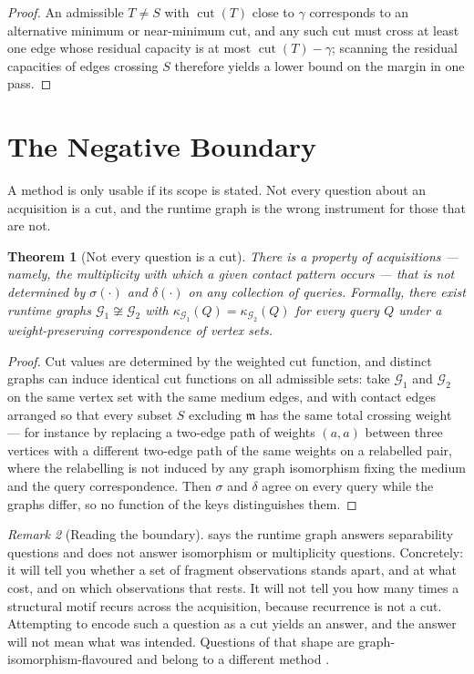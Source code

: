 \documentclass[11pt,a4paper]{article}
\newtheorem{theorem}{Theorem}[section]
\theoremstyle{definition}
\theoremstyle{remark}
\newtheorem{remark}[theorem]{Remark}
\newcommand{\Gph}{\mathcal{G}}
\newcommand{\med}{\mathfrak{m}}
\newcommand{\cut}{\operatorname{cut}}
\newcommand{\sep}{\sigma}
\newcommand{\dep}{\delta}
\newcommand{\key}{\kappa}
\begin{document}
\begin{proof}
An admissible $T \neq S$ with $\cut(T)$ close to $\gamma$ corresponds to
an alternative minimum or near-minimum cut, and any such cut must cross
at least one edge whose residual capacity is at most $\cut(T)-\gamma$;
scanning the residual capacities of edges crossing $S$ therefore yields a
lower bound on the margin in one pass.
\end{proof}

\section{The Negative Boundary}
\label{sec:limits}

A method is only usable if its scope is stated. Not every question about
an acquisition is a cut, and the runtime graph is the wrong instrument
for those that are not.

\begin{theorem}[Not every question is a cut]\label{thm:not-a-cut}
There is a property of acquisitions --- namely, the multiplicity with
which a given contact pattern occurs --- that is not determined by
$\sep(\cdot)$ and $\dep(\cdot)$ on any collection of queries. Formally,
there exist runtime graphs $\Gph_1 \not\cong \Gph_2$ with
$\key_{\Gph_1}(Q) = \key_{\Gph_2}(Q)$ for every query $Q$ under a
weight-preserving correspondence of vertex sets.
\end{theorem}

\begin{proof}
Cut values are determined by the weighted cut function, and distinct
graphs can induce identical cut functions on all admissible sets: take
$\Gph_1$ and $\Gph_2$ on the same vertex set with the same medium edges,
and with contact edges arranged so that every subset $S$ excluding $\med$
has the same total crossing weight --- for instance by replacing a
two-edge path of weights $(a,a)$ between three vertices with a different
two-edge path of the same weights on a relabelled pair, where the
relabelling is not induced by any graph isomorphism fixing the medium and
the query correspondence. Then $\sep$ and $\dep$ agree on every query
while the graphs differ, so no function of the keys distinguishes them.
\end{proof}

\begin{remark}[Reading the boundary]\label{rem:boundary}
 says the runtime graph answers separability
questions and does not answer isomorphism or multiplicity questions.
Concretely: it will tell you whether a set of fragment observations
stands apart, and at what cost, and on which observations that rests. It
will not tell you how many times a structural motif recurs across the
acquisition, because recurrence is not a cut. Attempting to encode such a
question as a cut yields an answer, and the answer will not mean what was
intended. Questions of that shape are graph-isomorphism-flavoured and
belong to a different method \citep{weisfeiler1968,cai1992optimal}.
\end{remark}
\end{document}
